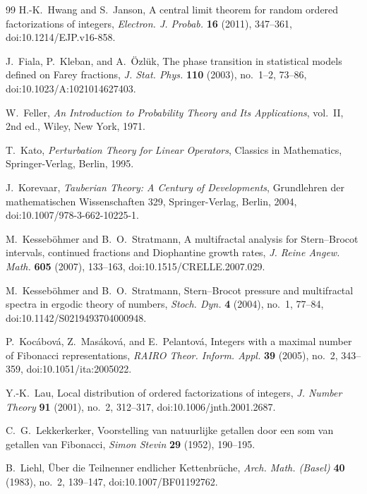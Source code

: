 \begin{thebibliography}{99}
H.-K.~Hwang and S.~Janson,
A central limit theorem for random ordered factorizations of integers,
\textit{Electron. J. Probab.} \textbf{16} (2011), 347--361,
doi:10.1214/EJP.v16-858.

J.~Fiala, P.~Kleban, and A.~\"Ozl\"uk,
The phase transition in statistical models defined on Farey fractions,
\textit{J. Stat. Phys.} \textbf{110} (2003), no.~1--2, 73--86,
doi:10.1023/A:1021014627403.

W.~Feller,
\textit{An Introduction to Probability Theory and Its Applications}, vol.~II,
2nd ed., Wiley, New York, 1971.

T.~Kato,
\textit{Perturbation Theory for Linear Operators},
Classics in Mathematics, Springer-Verlag, Berlin, 1995.

J.~Korevaar,
\textit{Tauberian Theory: A Century of Developments},
Grundlehren der mathematischen Wissenschaften 329,
Springer-Verlag, Berlin, 2004,
doi:10.1007/978-3-662-10225-1.

M.~Kesseb\"ohmer and B.~O.~Stratmann,
A multifractal analysis for Stern--Brocot intervals, continued fractions and
Diophantine growth rates,
\textit{J. Reine Angew. Math.} \textbf{605} (2007), 133--163,
doi:10.1515/CRELLE.2007.029.

M.~Kesseb\"ohmer and B.~O.~Stratmann,
Stern--Brocot pressure and multifractal spectra in ergodic theory of numbers,
\textit{Stoch. Dyn.} \textbf{4} (2004), no.~1, 77--84,
doi:10.1142/S0219493704000948.

P.~Koc\'abov\'a, Z.~Mas\'akov\'a, and E.~Pelantov\'a,
Integers with a maximal number of Fibonacci representations,
\textit{RAIRO Theor. Inform. Appl.} \textbf{39} (2005), no.~2, 343--359,
doi:10.1051/ita:2005022.

Y.-K.~Lau,
Local distribution of ordered factorizations of integers,
\textit{J. Number Theory} \textbf{91} (2001), no.~2, 312--317,
doi:10.1006/jnth.2001.2687.

C.~G.~Lekkerkerker,
Voorstelling van natuurlijke getallen door een som van getallen van Fibonacci,
\textit{Simon Stevin} \textbf{29} (1952), 190--195.

B.~Liehl,
\"Uber die Teilnenner endlicher Kettenbr\"uche,
\textit{Arch. Math. (Basel)} \textbf{40} (1983), no.~2, 139--147,
doi:10.1007/BF01192762.


\end{thebibliography}
